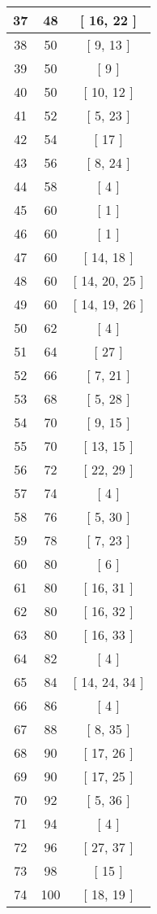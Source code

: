 \begin{center}
\begin{longtable}[H]{|| c c c ||}
37 & 48 & [ 16, 22 ]
\\\hline
38 & 50 & [ 9, 13 ]
\\\hline
39 & 50 & [ 9 ]
\\\hline
40 & 50 & [ 10, 12 ]
\\\hline
41 & 52 & [ 5, 23 ]
\\\hline
42 & 54 & [ 17 ]
\\\hline
43 & 56 & [ 8, 24 ]
\\\hline
44 & 58 & [ 4 ]
\\\hline
45 & 60 & [ 1 ]
\\\hline
46 & 60 & [ 1 ]
\\\hline
47 & 60 & [ 14, 18 ]
\\\hline
48 & 60 & [ 14, 20, 25 ]
\\\hline
49 & 60 & [ 14, 19, 26 ]
\\\hline
50 & 62 & [ 4 ]
\\\hline
51 & 64 & [ 27 ]
\\\hline
52 & 66 & [ 7, 21 ]
\\\hline
53 & 68 & [ 5, 28 ]
\\\hline
54 & 70 & [ 9, 15 ]
\\\hline
55 & 70 & [ 13, 15 ]
\\\hline
56 & 72 & [ 22, 29 ]
\\\hline
57 & 74 & [ 4 ]
\\\hline
58 & 76 & [ 5, 30 ]
\\\hline
59 & 78 & [ 7, 23 ]
\\\hline
60 & 80 & [ 6 ]
\\\hline
61 & 80 & [ 16, 31 ]
\\\hline
62 & 80 & [ 16, 32 ]
\\\hline
63 & 80 & [ 16, 33 ]
\\\hline
64 & 82 & [ 4 ]
\\\hline
65 & 84 & [ 14, 24, 34 ]
\\\hline
66 & 86 & [ 4 ]
\\\hline
67 & 88 & [ 8, 35 ]
\\\hline
68 & 90 & [ 17, 26 ]
\\\hline
69 & 90 & [ 17, 25 ]
\\\hline
70 & 92 & [ 5, 36 ]
\\\hline
71 & 94 & [ 4 ]
\\\hline
72 & 96 & [ 27, 37 ]
\\\hline
73 & 98 & [ 15 ]
\\\hline
74 & 100 & [ 18, 19 ]
\\\hline

\end{longtable}
\end{center}
